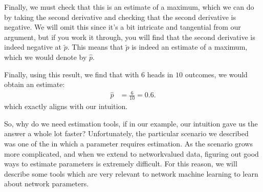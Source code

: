 \documentclass[letterpaper,10pt,english]{jupyterBook}
\begin{document}
\sphinxAtStartPar
Finally, we must check that this is an estimate of a maximum, which we can do by taking the second derivative and checking that the second derivative is negative. We will omit this since it’s a bit intricate and tangential from our argument, but if you work it through, you will find that the second derivative is indeed negative at \(\tilde p\). This means that \(\tilde p\) is indeed an estimate of a maximum, which we would denote by \(\hat p\).

\sphinxAtStartPar
Finally, using this result, we find that with \(6\) heads in \(10\) outcomes, we would obtain an estimate:
\begin{align*}
    \hat p &= \frac{6}{10} = 0.6.
\end{align*}
\sphinxAtStartPar
which exactly aligns with our intuition.

\sphinxAtStartPar
So, why do we need estimation tools, if in our example, our intuition gave us the answer a whole lot faster? Unfortunately, the particular scenario we described was one of the  in which a parameter requires estimation. As the scenario grows more complicated, and  when we extend to network\sphinxhyphen{}valued data, figuring out good ways to estimate parameters is extremely difficult. For this reason, we will describe some tools which are very relevant to network machine learning to learn about network parameters.
\end{document}
